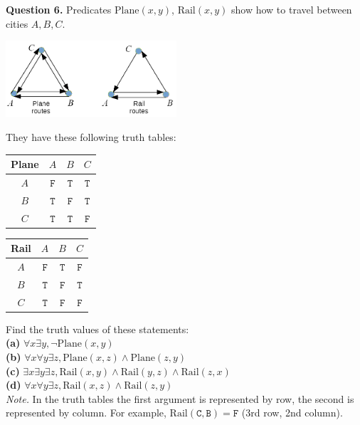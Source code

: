 \documentclass[jou]{apa6}
\begin{document}
{\bf Question 6.} Predicates $\mathrm{Plane}(x,y)$, 
$\mathrm{Rail}(x,y)$ show how to travel between cities $A,B,C$. 

\vspace{-10pt}
\begin{center}
\includegraphics[width=2.5in]{relation-graphs.png}
\end{center}
\vspace{-10pt}
They have these following truth tables:
\begin{center}
\begin{tabular}{c|ccc}
Plane & $A$ & $B$ & $C$ \\ \hline
$A$ & $\mathtt{F}$ & $\mathtt{T}$ & $\mathtt{T}$ \\
$B$ & $\mathtt{T}$ & $\mathtt{F}$ & $\mathtt{T}$ \\
$C$ & $\mathtt{T}$ & $\mathtt{T}$ & $\mathtt{F}$
\end{tabular}
\hspace{2ex}
\begin{tabular}{c|ccc}
Rail & $A$ & $B$ & $C$ \\ \hline
$A$ & $\mathtt{F}$ & $\mathtt{T}$ & $\mathtt{F}$ \\
$B$ & $\mathtt{T}$ & $\mathtt{F}$ & $\mathtt{T}$ \\
$C$ & $\mathtt{T}$ & $\mathtt{F}$ & $\mathtt{F}$
\end{tabular}
\end{center}
Find the truth values of these statements:\\
{\bf (a)} $\forall x \exists y, \neg \mathrm{Plane}(x,y)$\\
{\bf (b)} $\forall x \forall y \exists z, \mathrm{Plane}(x,z) \wedge \mathrm{Plane}(z,y)$\\
{\bf (c)} $\exists x \exists y \exists z, \mathrm{Rail}(x,y) \wedge \mathrm{Rail}(y,z) \wedge \mathrm{Rail}(z,x)$\\
{\bf (d)} $\forall x \forall y \exists z, \mathrm{Rail}(x,z) \wedge \mathrm{Rail}(z,y)$\\
{\em Note.} In the truth tables the first argument is
represented by row, the second is represented by column. 
For example, $\mathrm{Rail}(\mathtt{C}, \mathtt{B}) = \mathtt{F}$ (3rd row,
2nd column).
\end{document}

